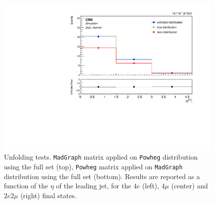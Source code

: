 \begin{figure}[hbtp]
\begin{center}
    \includegraphics[width=0.8\cmsFigWidth]{Figures/Unfolding/MCTests/EtaJet1_ZZTo2e2m_PowMatrix_MadDistr_FullSample_fr}  
 \caption{Unfolding tests. \texttt{MadGraph} matrix applied on \texttt{Powheg} distribution using the full set (top), \texttt{Powheg} matrix applied on \texttt{MadGraph} distribution using the full set (bottom). Results are reported as a function of  the $\eta$ of the leading jet, for the $4e$ (left), $4\mu$ (center) and $2e2\mu$ (right) final states.}
    \label{fig:MCtest_EtaJet12}
  \end{center}
\end{figure}
\clearpage
